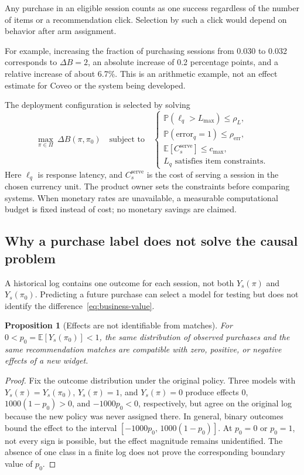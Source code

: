 \documentclass[12pt,a4paper]{article}
\newcommand{\E}{\mathbb E}
\newcommand{\Prob}{\mathbb P}
\theoremstyle{plainru}
\newtheorem{proposition}{Proposition}[section]
\begin{document}
Any purchase in an eligible session counts as one success regardless of the number
of items or a recommendation click. Selection by such a click would depend
on behavior after arm assignment.

For example, increasing the fraction of purchasing sessions from 0.030 to 0.032
corresponds to \(\Delta B=2\), an absolute increase of 0.2 percentage
points, and a relative increase of about 6.7\%. This is an arithmetic example,
not an effect estimate for Coveo or the system being developed.

The deployment configuration is selected by solving
\begin{equation}\label{eq:business-optimization}
\max_{\pi\in\Pi}\ \Delta B(\pi,\pi_0)
\quad\text{subject to}\quad
\begin{cases}
\Prob(\ell_q>L_{\max})\le\rho_L,\\
\Prob(\mathrm{error}_q=1)\le\rho_{\mathrm{err}},\\
\E[C_s^{\mathrm{serve}}]\le c_{\max},\\
L_q\text{ satisfies item constraints}.
\end{cases}
\end{equation}
Here \(\ell_q\) is response latency, and \(C_s^{\mathrm{serve}}\) is
the cost of serving a session in the chosen currency unit.
The product owner sets the constraints before comparing systems.
When monetary rates are unavailable, a measurable computational budget
is fixed instead of cost; no monetary savings are claimed.

\subsection{Why a purchase label does not solve the causal problem}

A historical log contains one outcome for each session,
not both \(Y_s(\pi)\) and \(Y_s(\pi_0)\). Predicting a future purchase
can select a model for testing but does not identify
the difference~\eqref{eq:business-value}.

\begin{proposition}[Effects are not identifiable from matches]\label{prop:business-nonidentification}
For $0<p_0=\E[Y_s(\pi_0)]<1$, the same distribution of observed purchases
and the same recommendation matches are compatible with zero,
positive, or negative effects of a new widget.
\end{proposition}
\begin{proof}
Fix the outcome distribution under the original policy. Three models with
$Y_s(\pi)=Y_s(\pi_0)$, $Y_s(\pi)=1$, and $Y_s(\pi)=0$ produce effects
$0$, $1000(1-p_0)>0$, and $-1000p_0<0$, respectively, but agree on the original
log because the new policy was never assigned there.
In general, binary outcomes bound the effect to the interval
$[-1000p_0,\,1000(1-p_0)]$. At $p_0=0$ or $p_0=1$, not every
sign is possible, but the effect magnitude remains unidentified.
The absence of one class in a finite log does not prove
the corresponding boundary value of $p_0$.
\end{proof}
\end{document}
